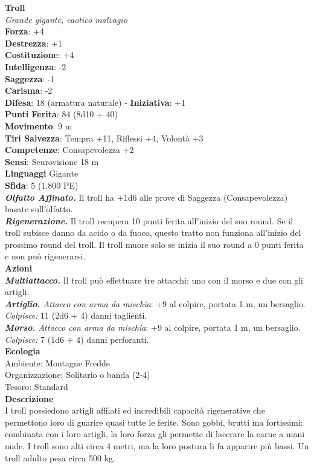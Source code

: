 \begin{multicols}{2}
\medskip\textbf{Troll}\\
\emph{Grande gigante, caotico malvagio}\\
\textbf{Forza}: +4\\
\textbf{Destrezza}: +1\\
\textbf{Costituzione}: +4\\
\textbf{Intelligenza}: -2\\
\textbf{Saggezza}: -1\\
\textbf{Carisma}: -2\\
\textbf{Difesa}: 18 (armatura naturale) - \textbf{Iniziativa}: +1\\
\textbf{Punti Ferita}: 84 (8d10 + 40)\\
\textbf{Movimento}: 9 m\\
\textbf{Tiri Salvezza}: Tempra +11, Riflessi +4, Volontà +3\\
\textbf{Competenze}: Consapevolezza +2\\
\textbf{Sensi}: Scurovisione 18 m\\
\textbf{Linguaggi} Gigante\\
\textbf{Sfida}: 5 (1.800 PE)\smallskip\\
\emph{\textbf{Olfatto Affinato.}} Il troll ha +1d6 alle prove di Saggezza (Consapevolezza) basate sull'olfatto.\\
\emph{\textbf{Rigenerazione.}} Il troll recupera 10 punti ferita all'inizio del suo round. Se il troll subisce danno da acido o da fuoco, questo tratto non funziona all'inizio del prossimo round del troll. Il troll muore solo se inizia il suo round a 0 punti ferita e non può rigenerarsi.\\
\smallskip\textbf{Azioni}\\
\emph{\textbf{Multiattacco.}} Il troll può effettuare tre attacchi: uno con il morso e due con gli artigli.\\
\emph{\textbf{Artiglio.} Attacco con arma da mischia}: +9 al colpire, portata 1 m, un bersaglio.\\
\emph{Colpisce:} 11 (2d6 + 4) danni taglienti.\\
\emph{\textbf{Morso.} Attacco con arma da mischia}: +9 al colpire, portata 1 m, un bersaglio.\\
\emph{Colpisce:} 7 (1d6 + 4) danni perforanti.\\
\textbf{Ecologia}\\
Ambiente: Montagne Fredde\\
Organizzazione: Solitario o banda (2-4)\\
Tesoro: Standard\\
\textbf{Descrizione}\\
I troll possiedono artigli affilati ed incredibili capacità rigenerative che permettono loro di guarire quasi tutte le ferite. Sono gobbi, brutti ma fortissimi: combinata con i loro artigli, la loro forza gli permette di lacerare la carne a mani nude. I troll sono alti circa 4 metri, ma la loro postura li fa apparire più bassi. Un troll adulto pesa circa 500 kg.\\


\end{multicols}
